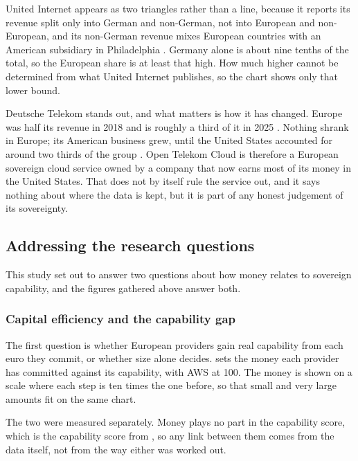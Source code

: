 United Internet appears as two triangles rather than a line, because it reports
its revenue split only into German and non-German, not into European and
non-European, and its non-German revenue mixes European countries with an American
subsidiary in Philadelphia \cite{UnitedInternet_AR_2025}. Germany alone is about
nine tenths of the total, so the European share is at least that high. How much
higher cannot be determined from what United Internet publishes, so the chart
shows only that lower bound.

Deutsche Telekom stands out, and what matters is how it has changed. Europe was
half its revenue in 2018 and is roughly a third of it in 2025
\cite{DT_AR_2018,DT_AR_2025}. Nothing shrank in Europe; its American business
grew, until the United States accounted for around two thirds of the group
\cite{DT_AR_2025}. Open Telekom Cloud is therefore a European sovereign cloud
service owned by a company that now earns most of its money in the United States.
That does not by itself rule the service out, and it says nothing about where the
data is kept, but it is part of any honest judgement of its sovereignty.

\subsection{Addressing the research questions}

This study set out to answer two questions about how money relates to sovereign
capability, and the figures gathered above answer both.

\subsubsection*{Capital efficiency and the capability gap}

The first question is whether European providers gain real capability from each euro
they commit, or whether size alone decides.  sets the money
each provider has committed against its capability, with \acs{AWS} at 100. The money
is shown on a scale where each step is ten times the one before, so that small and
very large amounts fit on the same chart.

The two were measured separately. Money plays no part in the capability score, which
is the capability score from , so any link between them comes
from the data itself, not from the way either was worked out.

